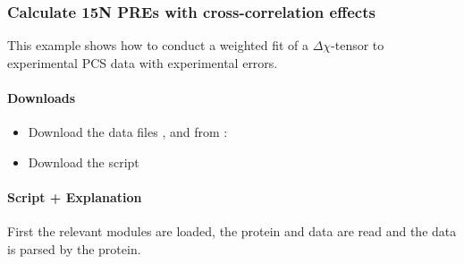 \documentclass[a4paper,10pt,english,openany,oneside]{sphinxmanual}
\begin{document}
\begin{sphinxVerbatim}[commandchars=\\\{\}]
\end{sphinxVerbatim}

\noindent{}


\subsubsection{Calculate 15N PREs with cross-correlation effects}
\label{\detokenize{examples/pre_calc_nitrogen:calculate-15n-pres-with-cross-correlation-effects}}\label{\detokenize{examples/pre_calc_nitrogen:pre-calc-nitrogen}}\label{\detokenize{examples/pre_calc_nitrogen::doc}}
This example shows how to conduct a weighted fit of a \({\Delta\chi}\)-tensor to experimental PCS data with experimental errors.


\paragraph{Downloads}
\label{\detokenize{examples/pre_calc_nitrogen:downloads}}\begin{itemize}
\item {} 
Download the data files ,  and  from :

\item {} 
Download the script 

\end{itemize}


\paragraph{Script + Explanation}
\label{\detokenize{examples/pre_calc_nitrogen:script-explanation}}
First the relevant modules are loaded, the protein and data are read and the data is parsed by the protein.
\end{document}
